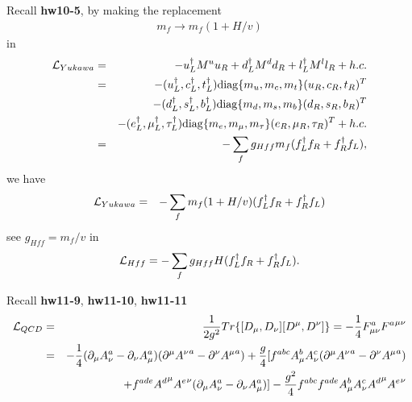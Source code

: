 \documentclass[11pt]{article}
\def\del{{\partial}}
\begin{document}
Recall {\bf hw10-5}, by making the replacement
\begin{eqnarray}
    m_f \to m_f (1+H/v)
  \end{eqnarray}
in
\begin{eqnarray}
    {\cal L}_{Yukawa} &=&
    -u_L^\dagger M^u u_R + d_L^\dagger M^d d_R + l_L^\dagger M^l l_R + h.c. \\
    &=&
    -(u_L^\dagger, c_L^\dagger, t_L^\dagger) {\rm diag}\{m_u,m_c,m_t\} (u_R,c_R,t_R)^T\nonumber \\
    &&-(d_L^\dagger, s_L^\dagger, b_L^\dagger) {\rm diag}\{m_d,m_s,m_b\} (d_R,s_R,b_R)^T \nonumber \\ &&- (e_L^\dagger, \mu_L^\dagger, \tau_L^\dagger) {\rm diag}\{m_e,m_\mu,m_\tau\} (e_R,\mu_R,\tau_R)^T
    +
    h.c. \\
    &=& - \sum_f g_{Hff} m_f (f_L^\dagger f_R + f_R^\dagger f_L),
  \end{eqnarray}
  we have
  \begin{eqnarray}
    {\cal L}_{Yukawa} &=& - \sum_f  m_f (1+H/v) (f_L^\dagger f_R + f_R^\dagger f_L)
 \end{eqnarray}
see $g_{Hff}=m_f/v$ in 
\begin{eqnarray}
    {\cal L}_{Hff} = - \sum_f g_{Hff} H (f_L^\dagger f_R + f_R^\dagger f_L).
\end{eqnarray}

Recall {\bf hw11-9}, {\bf hw11-10}, {\bf hw11-11}
\begin{eqnarray}
    {\cal L}_{QCD} &=& \frac{1}{2g^2} Tr\{ [D_\mu,D_\nu] [D^\mu,D^\nu] \} = -\frac{1}{4} F^a_{\mu\nu} {F^a}^{\mu\nu} \\
    &=& -\frac{1}{4}  (\del_\mu A_\nu^a-\del_\nu A_\mu^a)(\del^\mu {A^\nu}^a-\del^\nu {A^\mu}^a) + \frac{g}{4}[f^{abc} A^b_\mu A^c_\nu (\del^\mu {A^\nu}^a-\del^\nu {A^\mu}^a) \nonumber \\
    && + f^{ade} {A^d}^\mu {A^e}^\nu (\del_\mu A_\nu^a-\del_\nu A_\mu^a)]-\frac{g^2}{4} f^{abc} f^{ade} A^b_\mu A^c_\nu {A^d}^\mu {A^e}^\nu
\end{eqnarray}
\end{document}

